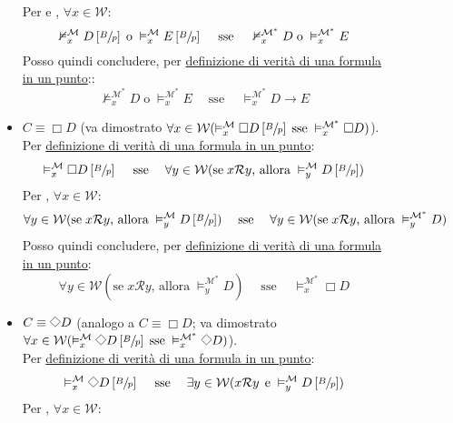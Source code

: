 \documentclass[a4paper,12pt]{article}
\newcommand{\latinmodern}[1]{\text{#1}}
\newcommand{\latinmath}[1]{\text{\latinmodern{#1}}} %
\newcommand{\Dmd}{\mathord{\vcenter{\hbox{\tikz[baseline=-0.6ex]{\draw[line width=0.4pt, scale=1, rotate=45] (0,0) rectangle (0.2,0.2);}}}}} %
\begin{document}
\begin{description}
\begin{dimo}
\begin{dimo}
\begin{description}
\begin{itemize}
					                  Per \latinmath{IH1} e \latinmath{IH2}, $\forall x \in \mathcal{W}$:
					                  $$\nvDash_x^{\mathcal{M}} D\left[\sfrac{B}{p}\right] \; \text{o} \; \vDash_x^{\mathcal{M}} E\left[\sfrac{B}{p}\right] \quad\; \text{sse} \quad\; \nvDash_x^{\mathcal{M^{\ast}}} D \; \text{o} \; \vDash_x^{\mathcal{M^{\ast}}} E$$
					                  Posso quindi concludere, per \hyperlink{defverp}{definizione di verità di una formula in un punto}::
					                  $$\nvDash_x^{\mathcal{M^{\ast}}} D \; \text{o} \; \vDash_x^{\mathcal{M^{\ast}}} E \quad\; \text{sse} \quad\; \vDash_x^{\mathcal{M^{\ast}}} D \to E$$
					            \item $C \equiv \Box D$ (va dimostrato \emph{$\forall x \in \mathcal{W} (\vDash_x^{\mathcal{M}} \Box D \left[\sfrac{B}{p}\right] \; \text{sse} \; \vDash_x^{\mathcal{M^{\ast}}} \Box D)$}). \\
					                  Per \hyperlink{defverp}{definizione di verità di una formula in un punto}:
					                  $$\vDash_x^{\mathcal{M}} \Box D \left[\sfrac{B}{p}\right] \quad\; \text{sse} \quad\; \forall y \in \mathcal{W} (\text{se} \; x\mathcal{R}y \text{, allora} \; \vDash_y^{\mathcal{M}} D \left[\sfrac{B}{p}\right])$$
					                  Per \latinmath{IH1}, $\forall x \in \mathcal{W}$:
					                  $$\forall y \in \mathcal{W} (\text{se} \; x\mathcal{R}y \text{, allora} \; \vDash_y^{\mathcal{M}} D \left[\sfrac{B}{p}\right]) \quad\; \text{sse} \quad\; \forall y \in \mathcal{W} (\text{se} \; x\mathcal{R}y \text{, allora} \; \vDash_y^{\mathcal{M^{\ast}}} D)$$
					                  Posso quindi concludere, per \hyperlink{defverp}{definizione di verità di una formula in un punto}:
					                  $$\forall y \in \mathcal{W} (\text{se} \; x\mathcal{R}y \text{, allora} \; \vDash_y^{\mathcal{M^{\ast}}} D) \quad\; \text{sse} \quad\; \vDash_x^{\mathcal{M^{\ast}}} \Box D$$
					            \item $C \equiv \Dmd D$ (analogo a $C \equiv \Box D$; va dimostrato \emph{$\forall x \in \mathcal{W} (\vDash_x^{\mathcal{M}} \Dmd D \left[\sfrac{B}{p}\right] \; \text{sse} \; \vDash_x^{\mathcal{M^{\ast}}} \Dmd D)$}). \\
					                  Per \hyperlink{defverp}{definizione di verità di una formula in un punto}:
					                  $$\vDash_x^{\mathcal{M}} \Dmd D \left[\sfrac{B}{p}\right] \quad\; \text{sse} \quad\; \exists y \in \mathcal{W} (x\mathcal{R}y \;\, \text{e} \; \vDash_y^{\mathcal{M}} D \left[\sfrac{B}{p}\right])$$
					                  Per \latinmath{IH1}, $\forall x \in \mathcal{W}$:

\end{itemize}
\end{description}
\end{dimo}
\end{dimo}
\end{description}
\end{document}
